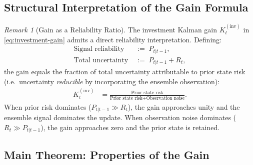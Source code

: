 \documentclass[12pt,openany]{book}
\numberwithin{equation}{chapter}
\theoremstyle{plain}
\theoremstyle{definition}
\theoremstyle{remark}
\newtheorem{remark}[theorem]{Remark}
\begin{document}
\subsection{Structural Interpretation of the Gain Formula}

\begin{remark}[Gain as a Reliability Ratio]
\label{rem:gain-ratio}
The investment Kalman gain $K_t^{(\mathrm{inv})}$ in
\eqref{eq:investment-gain} admits a direct reliability
interpretation. Defining:
\begin{align}
  \text{Signal reliability}
  &\;:=\; P_{t|t-1},
  \label{eq:signal-reliability} \\[3pt]
  \text{Total uncertainty}
  &\;:=\; P_{t|t-1} + R_t,
  \label{eq:total-uncertainty}
\end{align}
the gain equals the fraction of total uncertainty attributable
to prior state risk (i.e.\ uncertainty \emph{reducible} by
incorporating the ensemble observation):
\begin{align}
  K_t^{(\mathrm{inv})}
  &= \frac{\text{Prior state risk}}
          {\text{Prior state risk} + \text{Observation noise}}.
  \label{eq:gain-interpretation}
\end{align}
When prior risk dominates ($P_{t|t-1} \gg R_t$), the gain
approaches unity and the ensemble signal dominates the update.
When observation noise dominates ($R_t \gg P_{t|t-1}$), the
gain approaches zero and the prior state is retained.
\end{remark}

\subsection{Main Theorem: Properties of the Gain}
\end{document}
